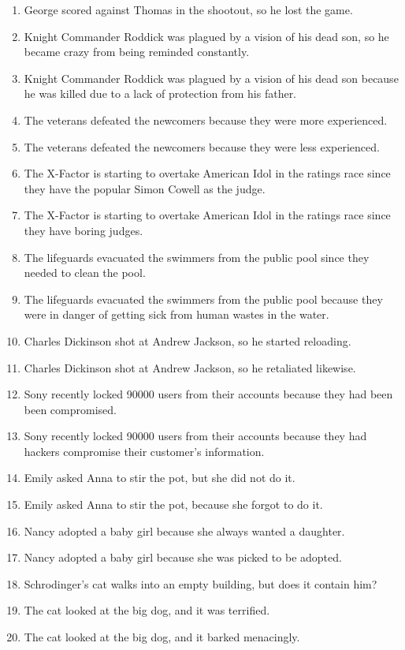 \documentclass{article}
\begin{document}
\begin{enumerate}
	\item George scored against Thomas in the shootout, so he lost the game.
	\item Knight Commander Roddick was plagued by a vision of his dead son, so he became crazy from being reminded constantly.
	\item Knight Commander Roddick was plagued by a vision of his dead son because he was killed due to a lack of protection from his father.
	\item The veterans defeated the newcomers because they were more experienced.
	\item The veterans defeated the newcomers because they were less experienced.
	\item The X-Factor is starting to overtake American Idol in the ratings race since they have the popular Simon Cowell as the judge.
	\item The X-Factor is starting to overtake American Idol in the ratings race since they have boring judges.
	\item The lifeguards evacuated the swimmers from the public pool since they needed to clean the pool.
	\item The lifeguards evacuated the swimmers from the public pool because they were in danger of getting sick from human wastes in the water.
	\item Charles Dickinson shot at Andrew Jackson, so he started reloading.
	\item Charles Dickinson shot at Andrew Jackson, so he retaliated likewise.
	\item Sony recently locked 90000 users from their accounts because they had been been compromised.
	\item Sony recently locked 90000 users from their accounts because they had hackers compromise their customer's information.
	\item Emily asked Anna to stir the pot, but she did not do it.
	\item Emily asked Anna to stir the pot, because she forgot to do it.
	\item Nancy adopted a baby girl because she always wanted a daughter.
	\item Nancy adopted a baby girl because she was picked to be adopted.
	\item Schrodinger's cat walks into an empty building, but does it contain him?
	\item The cat looked at the big dog, and it was terrified.
	\item The cat looked at the big dog, and it barked menacingly.

\end{enumerate}
\end{document}
